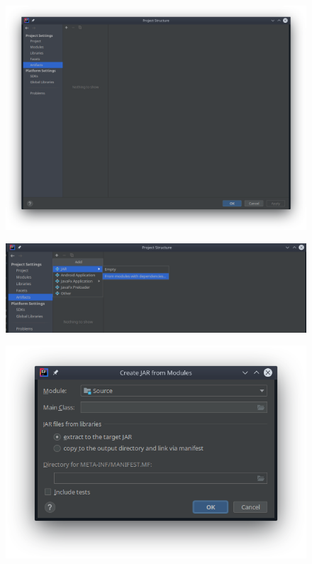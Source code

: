 \documentclass{article}
\begin{document}
\begin{figure}[h!]
  \centering
  \includegraphics[scale=0.55]{./Pictures/005_jar.png}
\end{figure}

\newpage

\begin{figure}[h!]
  \centering
  \includegraphics[scale=0.55]{./Pictures/006_jar.png}
\end{figure}

\begin{figure}[h!]
  \centering
  \includegraphics[scale=0.65]{./Pictures/007_jar.png}
\end{figure}
\end{document}

